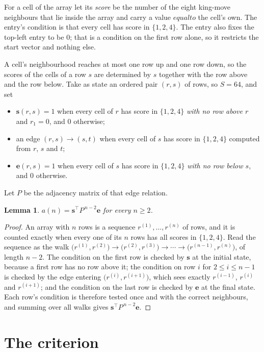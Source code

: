 \documentclass[11pt,a4paper]{article}
\theoremstyle{plain}
\newtheorem{lemma}[theorem]{Lemma}
\theoremstyle{definition}
\begin{document}
For a cell of the array let its \emph{score} be the number of the eight king-move neighbours that lie inside
the array and carry a value $equal to$ the cell's own. The entry's condition is that every cell
has score in $\{1,2,4\}$. The entry also fixes the top-left entry to be $0$; that is a condition on the first row alone, so it restricts the start vector and nothing else.

A cell's neighbourhood reaches at most one row up and one row down, so the scores of the
cells of a row $s$ are determined by $s$ together with the row above and the row below.
Take as state an ordered pair $(r,s)$ of rows, so $S=64$, and set
\begin{itemize}
\item $\mathbf{s}(r,s)=1$ when every cell of $r$ has score in $\{1,2,4\}$ \emph{with no row
above $r$} and $r_1=0$, and $0$ otherwise;
\item an edge $(r,s)\to(s,t)$ when every cell of $s$ has score in $\{1,2,4\}$ computed from
$r$, $s$ and $t$;
\item $\mathbf{e}(r,s)=1$ when every cell of $s$ has score in $\{1,2,4\}$ \emph{with no row
below $s$}, and $0$ otherwise.
\end{itemize}
Let $P$ be the adjacency matrix of that edge relation.

\begin{lemma}\label{lem:walk}
$a(n)=\mathbf{s}^{\!\top}P^{\,n-2}\mathbf{e}$ for every $n\ge2$.
\end{lemma}

\begin{proof}
An array with $n$ rows is a sequence $r^{(1)},\dots,r^{(n)}$ of rows, and it is counted
exactly when every one of its $n$ rows has all scores in $\{1,2,4\}$. Read the sequence as the
walk $\bigl(r^{(1)},r^{(2)}\bigr)\to\bigl(r^{(2)},r^{(3)}\bigr)\to\cdots\to
\bigl(r^{(n-1)},r^{(n)}\bigr)$, of length $n-2$. The condition on the first row is
checked by $\mathbf{s}$ at the initial state, because a first row has no row above it; the
condition on row $i$ for $2\le i\le n-1$ is checked by the edge entering
$\bigl(r^{(i)},r^{(i+1)}\bigr)$, which sees exactly $r^{(i-1)}$, $r^{(i)}$ and
$r^{(i+1)}$; and the condition on the last row is checked by $\mathbf{e}$ at the final
state. Each row's condition is therefore tested once and with the correct neighbours, and
summing over all walks gives $\mathbf{s}^{\!\top}P^{\,n-2}\mathbf{e}$.
\end{proof}

\section{The criterion}
\end{document}
